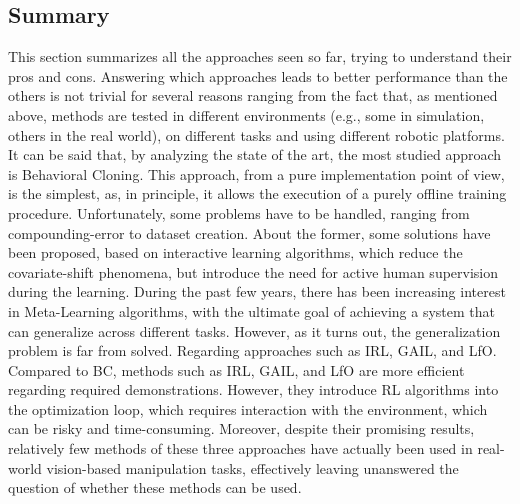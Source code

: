 \newpage
\subsection{Summary}
\label{sec:summary}
This section summarizes all the approaches seen so far, trying to understand their pros and cons. Answering which approaches leads to better performance than the others is not trivial for several reasons ranging from the fact that, as mentioned above, methods are tested in different environments (e.g., some in simulation, others in the real world), on different tasks and using different robotic platforms. It can be said that, by analyzing the state of the art, the most studied approach is Behavioral Cloning. This approach, from a pure implementation point of view, is the simplest, as, in principle, it allows the execution of a purely offline training procedure. Unfortunately, some problems have to be handled, ranging from compounding-error to dataset creation. About the former, some solutions have been proposed, based on interactive learning algorithms, which reduce the covariate-shift phenomena, but introduce the need for active human supervision during the learning. During the past few years, there has been increasing interest in Meta-Learning algorithms, with the ultimate goal of achieving a system that can generalize across different tasks. However, as it turns out, the generalization problem is far from solved. 
Regarding approaches such as IRL, GAIL, and LfO. Compared to BC, methods such as IRL, GAIL, and LfO are more efficient regarding required demonstrations. However, they introduce RL algorithms into the optimization loop, which requires interaction with the environment, which can be risky and time-consuming. Moreover, despite their promising results, relatively few methods of these three approaches have actually been used in real-world vision-based manipulation tasks, effectively leaving unanswered the question of whether these methods can be used.